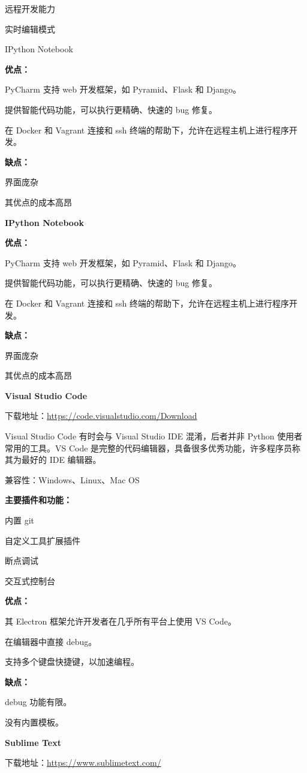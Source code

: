 \documentclass[]{ctexbook}
\begin{document}
远程开发能力

实时编辑模式

IPython Notebook

\textbf{优点：}

PyCharm 支持 web 开发框架，如 Pyramid、Flask 和 Django。

提供智能代码功能，可以执行更精确、快速的 bug 修复。

在 Docker 和 Vagrant 连接和 ssh 终端的帮助下，允许在远程主机上进行程序开发。

\textbf{缺点：}

界面庞杂

其优点的成本高昂

\textbf{IPython Notebook}

\textbf{优点：}

PyCharm 支持 web 开发框架，如 Pyramid、Flask 和 Django。

提供智能代码功能，可以执行更精确、快速的 bug 修复。

在 Docker 和 Vagrant 连接和 ssh 终端的帮助下，允许在远程主机上进行程序开发。

\textbf{缺点：}

界面庞杂

其优点的成本高昂

\textbf{Visual Studio Code}

下载地址：\url{https://code.visualstudio.com/Download}

Visual Studio Code 有时会与 Visual Studio IDE 混淆，后者并非 Python 使用者常用的工具。VS Code 是完整的代码编辑器，具备很多优秀功能，许多程序员称其为最好的 IDE 编辑器。

兼容性：Windows、Linux、Mac OS

\textbf{主要插件和功能：}

内置 git

自定义工具扩展插件

断点调试

交互式控制台

\textbf{优点：}

其 Electron 框架允许开发者在几乎所有平台上使用 VS Code。

在编辑器中直接 debug。

支持多个键盘快捷键，以加速编程。

\textbf{缺点：}

debug 功能有限。

没有内置模板。

\textbf{Sublime Text}

下载地址：\url{https://www.sublimetext.com/}
\end{document}
